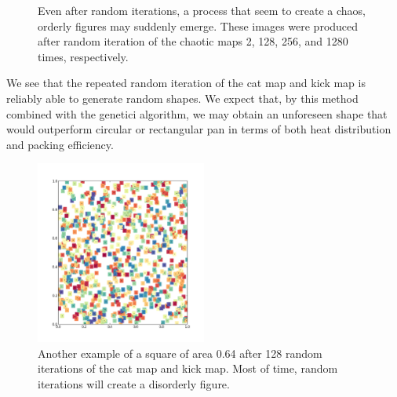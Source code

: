 \documentclass[12pt]{reedmcm}
\begin{document}
\begin{figure}[h!]
  \caption{Even after random iterations, a process that seem to create a chaos, orderly figures may suddenly emerge.
  These images were produced after random iteration of the chaotic maps 2, 128, 256, and 1280 times, respectively.}
  \label{fig:order}
\end{figure}
%
We see that the repeated random iteration of the cat map and kick map is reliably able to generate random shapes.
We expect that, by this method combined with the genetici algorithm, we may obtain an unforeseen shape that would outperform circular or rectangular pan in terms of both heat distribution and packing efficiency.
\begin{figure}[h!]
  \centering
  \includegraphics[width=0.5\textwidth]{chaotic_shape}
  \caption{Another example of a square of area 0.64 after 128 random iterations of the cat map and kick map.
  Most of time, random iterations will create a disorderly figure.
  }
  \label{fig:chaotic}
\end{figure}
\end{document}
